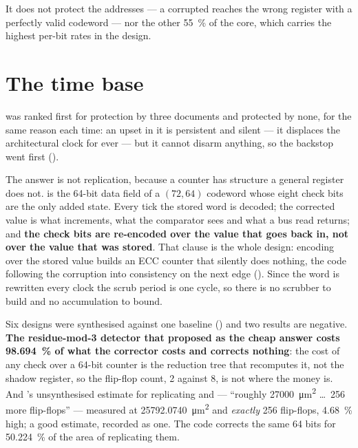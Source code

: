 It does not protect the addresses --- a corrupted  reaches
the wrong register with a perfectly valid codeword --- nor the other
\SI{55}{\percent} of the core, which carries the highest per-bit rates
in the design.

\section{The time base}
\label{sec:harden-mtime}

 was ranked first for protection by three documents and
protected by none, for the same reason each time: an upset in it is
persistent and silent --- it displaces the architectural clock for ever
--- but it cannot disarm anything, so the backstop went first
().

The answer is not replication, because a counter has structure a general
register does not.  is the 64-bit data field of a $(72,64)$
codeword whose eight check bits are the only added state. Every tick the
stored word is decoded; the corrected value is what increments, what the
comparator sees and what a bus read returns; and \textbf{the check bits
are re-encoded over the value that goes back in, not over the value that
was stored}. That clause is the whole design: encoding over the stored
value builds an ECC counter that silently does nothing, the code
following the corruption into consistency on the next edge
(). Since the word is rewritten every clock the
scrub period is one cycle, so there is no scrubber to build and no
accumulation to bound.

Six designs were synthesised against one baseline
() and two results are negative. \textbf{The
residue-mod-3 detector that  proposed as the
cheap answer costs \SI{98.694}{\percent} of what the corrector costs and
corrects nothing}: the cost of any check over a 64-bit counter is the
reduction tree that recomputes it, not the shadow register, so the
flip-flop count, 2 against 8, is not where the money is. And
's unsynthesised estimate for replicating  and
 --- ``roughly \SI{27000}{\micro\meter\squared} \dots\
256 more flip-flops'' --- measured at
\SI{25792.0740}{\micro\meter\squared} and \emph{exactly} 256 flip-flops,
\SI{4.68}{\percent} high; a good estimate, recorded as one. The code
corrects the same 64 bits for \SI{50.224}{\percent} of the area of
replicating them.

